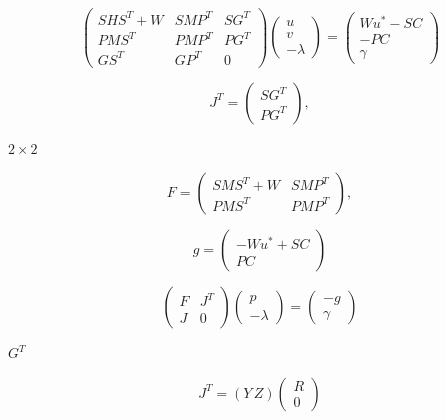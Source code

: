 \documentclass{article}
\begin{document}
\[
  \left(
    \begin{array}{ccc}
     S H S^T+W & S M P^T & S G^T \\
     P M S^T & P M P^T & P G^T \\
     G S^T & G P^T & 0
    \end{array}
  \right)
  \left(
    \begin{array}{c}
     u \\
     v \\
     -\lambda
    \end{array}
  \right)
  =
  \left(
    \begin{array}{c}
      Wu^* -SC\\
      -PC\\
     \gamma
    \end{array}
  \right)
 \]
\pagebreak

\[ 
   J^T = \left( \begin{array}{c} S G^T \\ P G^T \end{array} \right),
 \]
\pagebreak

$2 \times 2$
\pagebreak

\[
 F = \left( \begin{array}{cc} 
             SMS^T + W & SMP^T \\ 
             PMS^T & PMP^T \end{array} \right),
 \]
\pagebreak

\[
   g = \left( \begin{array}{c} -Wu^* + SC \\ PC \end{array} \right)
 \]
\pagebreak

\[
   \left( \begin{array}{cc}
           F & J^T \\
           J & 0
           \end{array}
   \right)
   \left( \begin{array}{c}
             p \\
            -\lambda 
           \end{array}
   \right)
   =
 \left( \begin{array}{c}
             -g \\
             \gamma 
           \end{array}
   \right)        
 \]
\pagebreak

$G^T$
\pagebreak

\[ 
   J^T = \left( Y \, Z \right)\left( \begin{array}{c} R \\ 0 \end{array} \right)
 \]
\pagebreak
\end{document}
